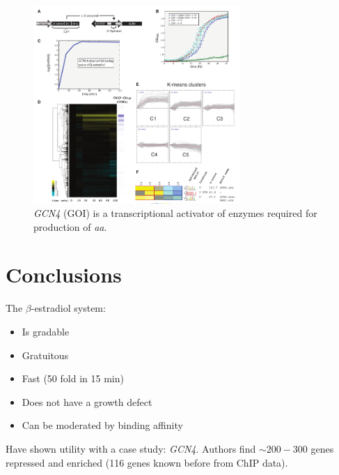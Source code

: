 \documentclass{beamer}
\begin{document}
\begin{frame}
    \begin{figure}[ht!]
        \centering
        \includegraphics[width=0.7\textwidth]{McIsaacfig7.png}
        \caption{\emph{GCN4} (GOI) is a transcriptional activator of enzymes required for production of \emph{aa}.}
        \label{fig:growthGEV}
    \end{figure}
\end{frame}

\section{Conclusions}
\begin{frame}
    The $\beta$-estradiol system:
    \begin{itemize}
        \item Is gradable
        \item Gratuitous
        \item Fast (50 fold in 15 min)
        \item Does not have a growth defect
        \item Can be moderated by binding affinity %
    \end{itemize}
    \pause
    Have shown utility with a case study: \emph{GCN4}. Authors find $\sim 200-300$ genes repressed and enriched (116 genes known before from ChIP data).
\end{frame}
\end{document}
